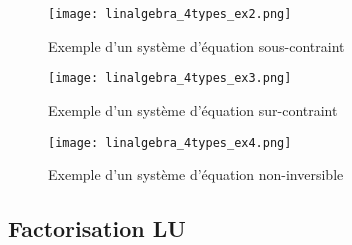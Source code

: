 \begin{example}
\begin{figure}[H]
	\centering
		\texttt{[image: linalgebra\_4types\_ex2.png]}
	\caption{Exemple d'un système d'équation sous-contraint}
	\label{fig:rmn_ex2}
\end{figure}
\end{example}

\begin{example}
\begin{figure}[H]
	\centering
		\texttt{[image: linalgebra\_4types\_ex3.png]}
	\caption{Exemple d'un système d'équation sur-contraint}
	\label{fig:rmn_ex3}
\end{figure}
\end{example}

\begin{example}
\begin{figure}[H]
	\centering
		\texttt{[image: linalgebra\_4types\_ex4.png]}
	\caption{Exemple d'un système d'équation non-inversible}
	\label{fig:rmn_ex4}
\end{figure}
\end{example}


\subsection{Factorisation LU}
\label{sec:lu}

